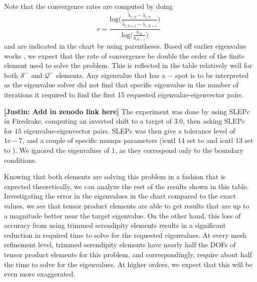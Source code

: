 \documentclass[format=acmsmall,screen,timestamp=false,a4paper]{acmart}
\newcommand\justin[1]{\textbf{\textcolor[rgb]{0,1,0.5}{[Justin: #1]}}}
\newcommand{\calQ}{\mathcal{Q}}
\newcommand{\calS}{\mathcal{S}}
\begin{document}
Note that the convergence rates are computed by doing
\[r = \frac{\text{log}\bigg(\frac{\tilde{\lambda}_{i,N} - \lambda_{i,N}}{\tilde{\lambda}_{i,N+1} - \lambda_{i,N+1}} \bigg)}{\text{log}\bigg( \frac{h_N}{h_{N+1}} \bigg)} \]
\noindent and are indicated in the chart by using parentheses.  Based off earlier eigenvalue works \cite{boffi2010finite}, we expect that the rate of convergence be double the order of the finite element used to solve the problem.  This is reflected in the table relatively well for both $\mathcal{S}^-$ and $\mathcal{Q}^-$ elements.  Any eigenvalue that has a $-$ spot is to be interpreted as the eigenvalue solver did not find that specific eigenvalue in the number of iterations it required to find the first 15 requested eigenvalue-eigenvector pairs.



\justin{Add in zenodo link here}
The experiment was done by using SLEPc in Firedrake, computing an inverted shift to a target of $3.0$, then asking SLEPc for $15$ eigenvalue-eigenvector pairs.  SLEPc was then give a tolerance level of $1\text{e}-7$, and a couple of specific mumps parameters ({\selectfont icntl 14} set to {} and {\selectfont icntl 13} set to {}). We ignored the eigenvalues of $1$, as they correspond only to the boundary conditions. 

Knowing that both elements are solving this problem in a fashion that is expected theoretically, we can analyze the rest of the results shown in this table.  Investigating the error in the eigenvalues in the chart compared to the exact values, we see that tensor product elements are able to get results that are up to a magnitude better near the target eigenvalue.  On the other hand, this loss of accuracy from using trimmed serendipity elements results in a significant reduction in required time to solve for the requested eigenvalues.  At every mesh refinement level, trimmed serendipity elements have nearly half the DOFs of tensor product elements for this problem, and correspondingly, require about half the time to solve for the eigenvalues.  At higher orders, we expect that this will be even more exaggerated.  
\end{document}
